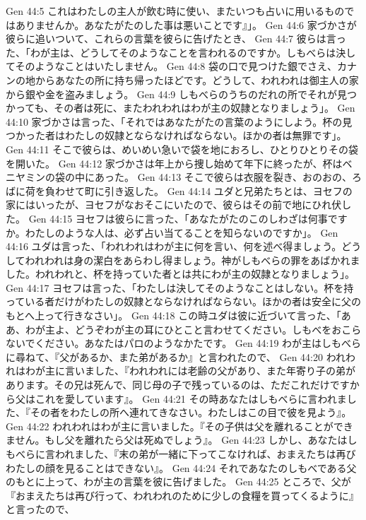 Gen 44:5  これはわたしの主人が飲む時に使い、またいつも占いに用いるものではありませんか。あなたがたのした事は悪いことです』」。
Gen 44:6  家づかさが彼らに追いついて、これらの言葉を彼らに告げたとき、
Gen 44:7  彼らは言った、「わが主は、どうしてそのようなことを言われるのですか。しもべらは決してそのようなことはいたしません。
Gen 44:8  袋の口で見つけた銀でさえ、カナンの地からあなたの所に持ち帰ったほどです。どうして、われわれは御主人の家から銀や金を盗みましょう。
Gen 44:9  しもべらのうちのだれの所でそれが見つかっても、その者は死に、またわれわれはわが主の奴隷となりましょう」。
Gen 44:10  家づかさは言った、「それではあなたがたの言葉のようにしよう。杯の見つかった者はわたしの奴隷とならなければならない。ほかの者は無罪です」。
Gen 44:11  そこで彼らは、めいめい急いで袋を地におろし、ひとりひとりその袋を開いた。
Gen 44:12  家づかさは年上から捜し始めて年下に終ったが、杯はベニヤミンの袋の中にあった。
Gen 44:13  そこで彼らは衣服を裂き、おのおの、ろばに荷を負わせて町に引き返した。
Gen 44:14  ユダと兄弟たちとは、ヨセフの家にはいったが、ヨセフがなおそこにいたので、彼らはその前で地にひれ伏した。
Gen 44:15  ヨセフは彼らに言った、「あなたがたのこのしわざは何事ですか。わたしのような人は、必ず占い当てることを知らないのですか」。
Gen 44:16  ユダは言った、「われわれはわが主に何を言い、何を述べ得ましょう。どうしてわれわれは身の潔白をあらわし得ましょう。神がしもべらの罪をあばかれました。われわれと、杯を持っていた者とは共にわが主の奴隷となりましょう」。
Gen 44:17  ヨセフは言った、「わたしは決してそのようなことはしない。杯を持っている者だけがわたしの奴隷とならなければならない。ほかの者は安全に父のもとへ上って行きなさい」。
Gen 44:18  この時ユダは彼に近づいて言った、「ああ、わが主よ、どうぞわが主の耳にひとこと言わせてください。しもべをおこらないでください。あなたはパロのようなかたです。
Gen 44:19  わが主はしもべらに尋ねて、『父があるか、また弟があるか』と言われたので、
Gen 44:20  われわれはわが主に言いました、『われわれには老齢の父があり、また年寄り子の弟があります。その兄は死んで、同じ母の子で残っているのは、ただこれだけですから父はこれを愛しています』。
Gen 44:21  その時あなたはしもべらに言われました、『その者をわたしの所へ連れてきなさい。わたしはこの目で彼を見よう』。
Gen 44:22  われわれはわが主に言いました。『その子供は父を離れることができません。もし父を離れたら父は死ぬでしょう』。
Gen 44:23  しかし、あなたはしもべらに言われました、『末の弟が一緒に下ってこなければ、おまえたちは再びわたしの顔を見ることはできない』。
Gen 44:24  それであなたのしもべである父のもとに上って、わが主の言葉を彼に告げました。
Gen 44:25  ところで、父が『おまえたちは再び行って、われわれのために少しの食糧を買ってくるように』と言ったので、

